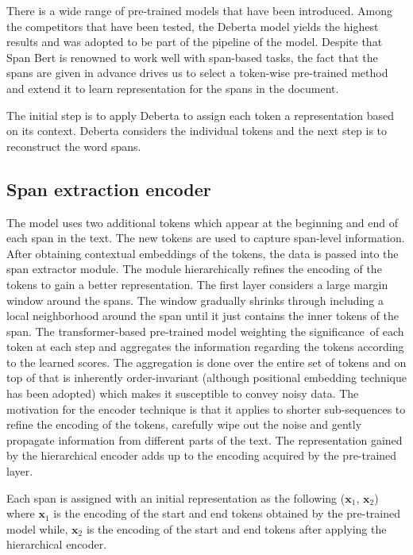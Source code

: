 \documentclass[11pt, a4paper, twocolumn]{article}
\begin{document}
There is a wide range of pre-trained models that have been introduced. Among the competitors that have been tested, the Deberta model yields the highest results and was adopted to be part of the pipeline of the model. Despite that Span Bert is renowned to work well with span-based tasks, the fact that the spans are given in advance drives us to select a token-wise pre-trained method and extend it to learn representation for the spans in the document.

The initial step is to apply Deberta to assign each token a representation based on its context.
Deberta considers the individual tokens and the next step is to reconstruct the word spans. 


\subsection{Span extraction encoder}
\label{spanencoder}

The model uses two additional tokens which appear at the beginning and end of each span in the text. 
The new tokens are used to capture span-level information.
After obtaining contextual embeddings of the tokens, the data is passed into the span extractor module. 
The module hierarchically refines the encoding of the tokens to gain a better representation. The first layer considers a large margin window around the spans. The window gradually shrinks through including a local neighborhood around the span until it just contains the inner tokens of the span. The transformer-based pre-trained model weighting the significance of each token at each step and aggregates the information regarding the tokens according to the learned scores. The aggregation is done over the entire set of tokens and on top of that is inherently order-invariant (although positional embedding technique has been adopted) which makes it susceptible to convey noisy data. The motivation for the encoder technique is that it applies to shorter sub-sequences to refine the encoding of the tokens, carefully wipe out the noise and gently propagate information from different parts of the text.
The representation gained by the hierarchical encoder adds up to the encoding acquired by the pre-trained layer. 

Each span is assigned with an initial representation as the following ($\mathbf{x}_1$, $\mathbf{x}_2$)
where $\mathbf{x}_1$ is the encoding of the start and end tokens obtained by the pre-trained model while, 
$\mathbf{x}_2$ is the encoding of the start and end tokens after applying the hierarchical encoder.
\end{document}
